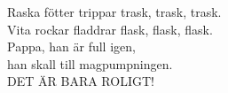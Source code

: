
            Raska fötter trippar trask, trask, trask. \\
            Vita rockar fladdrar flask, flask, flask. \\
            Pappa, han är full igen, \\
            han skall till magpumpningen. \\
            DET ÄR BARA ROLIGT! \\
